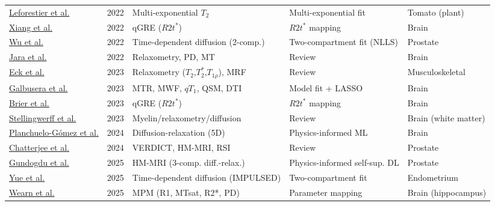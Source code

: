\documentclass[sn-mathphys,Numbered]{sn-jnl}
\begin{document}
\begin{table}[t]
\begin{tabularx}{\textwidth}{@{}>{\raggedright\arraybackslash}p{2.2cm} c >{\raggedright\arraybackslash}X >{\raggedright\arraybackslash}X >{\raggedright\arraybackslash}p{2.0cm}@{}}
    \href{https://pubmed.ncbi.nlm.nih.gov/34964166/}{Leforestier et al.} & 2022 & Multi-exponential $T_2$ & Multi-exponential fit & Tomato (plant) \\
    \href{https://pubmed.ncbi.nlm.nih.gov/35196933/}{Xiang et al.} & 2022 & qGRE ($R2t^{*}$) & $R2t^{*}$ mapping & Brain \\
    \href{https://pubmed.ncbi.nlm.nih.gov/35258368/}{Wu et al.} & 2022 & Time-dependent diffusion (2-comp.) & Two-compartment fit (NLLS) & Prostate \\
    \href{https://pubmed.ncbi.nlm.nih.gov/36040334/}{Jara et al.} & 2022 & Relaxometry, PD, MT & Review & Brain \\
    \href{https://pubmed.ncbi.nlm.nih.gov/36165880/}{Eck et al.} & 2023 & Relaxometry ($T_2$,$T_2^{*}$,$T_{1\rho}$), MRF & Review & Musculoskeletal \\
    \href{https://pubmed.ncbi.nlm.nih.gov/36480267/}{Galbusera et al.} & 2023 & MTR, MWF, $qT_1$, QSM, DTI & Model fit + LASSO & Brain \\
    \href{https://pubmed.ncbi.nlm.nih.gov/37004272/}{Brier et al.} & 2023 & qGRE ($R2t^{*}$) & $R2t^{*}$ mapping & Brain \\
    \href{https://pubmed.ncbi.nlm.nih.gov/37150021/}{Stellingwerff et al.} & 2023 & Myelin/relaxometry/diffusion & Review & Brain (white matter) \\
    \href{https://pubmed.ncbi.nlm.nih.gov/38471339/}{Planchuelo-G\'omez et al.} & 2024 & Diffusion-relaxation (5D) & Physics-informed ML & Brain \\
    \href{https://pubmed.ncbi.nlm.nih.gov/38856839/}{Chatterjee et al.} & 2024 & VERDICT, HM-MRI, RSI & Review & Prostate \\
    \href{https://pubmed.ncbi.nlm.nih.gov/39907585/}{Gundogdu et al.} & 2025 & HM-MRI (3-comp. diff.-relax.) & Physics-informed self-sup. DL & Prostate \\
    \href{https://pubmed.ncbi.nlm.nih.gov/41015861/}{Yue et al.} & 2025 & Time-dependent diffusion (IMPULSED) & Two-compartment fit & Endometrium \\
    \href{https://pubmed.ncbi.nlm.nih.gov/41144662/}{Wearn et al.} & 2025 & MPM (R1, MTsat, R2*, PD) & Parameter mapping & Brain (hippocampus) \\
    \bottomrule
  \end{tabularx}
\end{table}
\end{document}

